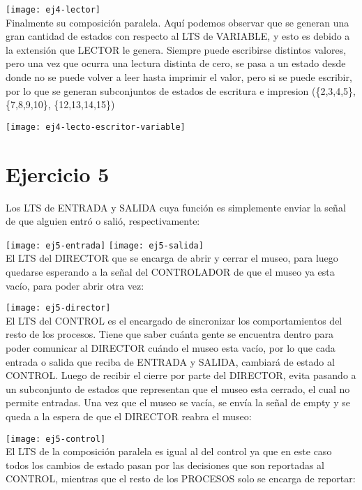 \texttt{[image: ej4-lector]} \\

Finalmente su composición paralela. Aquí podemos observar que se generan una gran cantidad de estados con respecto al LTS de VARIABLE, y esto es debido a la extensión que LECTOR le genera. Siempre puede escribirse distintos valores, pero una vez que ocurra una lectura distinta de cero, se pasa a un estado desde donde no se puede volver a leer hasta imprimir el valor, pero si se puede escribir, por lo que se generan subconjuntos de estados de escritura e impresion (\{2,3,4,5\}, \{7,8,9,10\}, \{12,13,14,15\})

\begin{landscape}
\texttt{[image: ej4-lecto-escritor-variable]} \\
\end{landscape}

\section{Ejercicio 5}
Los LTS de ENTRADA y SALIDA cuya función es simplemente enviar la señal de que alguien entró o salió, respectivamente:

\texttt{[image: ej5-entrada]} 
\texttt{[image: ej5-salida]} \\

El LTS del DIRECTOR que se encarga de abrir y cerrar el museo, para luego quedarse esperando a la señal del CONTROLADOR de que el museo ya esta vacío, para poder abrir otra vez:

\texttt{[image: ej5-director]} \\

El LTS del CONTROL es el encargado de sincronizar los comportamientos del resto de los procesos. Tiene que saber cuánta gente se encuentra dentro para poder comunicar al DIRECTOR cuándo el museo esta vacío, por lo que cada entrada o salida que reciba de ENTRADA y SALIDA, cambiará de estado al CONTROL. Luego de recibir el cierre por parte del DIRECTOR, evita pasando a un subconjunto de estados que representan que el museo esta cerrado, el cual no permite entradas. Una vez que el museo se vacía, se envía la señal de empty y se queda a la espera de que el DIRECTOR reabra el museo:

\texttt{[image: ej5-control]} \\

El LTS de la composición paralela es igual al del control ya que en este caso todos los cambios de estado pasan por las decisiones que son reportadas al CONTROL, mientras que el resto de los PROCESOS solo se encarga de reportar:

